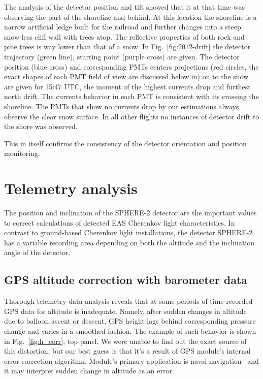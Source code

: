 \documentclass[final,5p,times,twocolumn]{elsarticle}
\begin{document}
The analysis of the detector position and tilt showed that it at that time was observing the part of the shoreline and behind. At this location the shoreline is a narrow artificial ledge built for the railroad and further changes into a steep snow-less cliff wall with trees atop. The reflective properties of both rock and pine trees is way lower than that of a snow. In Fig.~\ref{fig:2012-drift} the detector trajectory (green line), starting point (purple cross) are given. The detector position (blue cross) and corresponding PMTs centers projections (red circles, the exact shapes of each PMT field of view are discussed below in) on to the snow are given for 15:47 UTC, the moment of the highest currents drop and furthest north drift. The currents behavior in each PMT is consistent with its crossing the shoreline. The PMTs that show no currents drop by our estimations always observe the clear snow surface. In all other flights no instances of detector drift to the shore was observed.

This in itself confirms the consistency of the detector orientation and position monitoring.

\section{Telemetry analysis}

The position and inclination of the SPHERE-2 detector are the important values to correct calculations of detected EAS Cherenkov light characteristics. In contrast to ground-based Cherenkov light installations, the detector SPHERE-2 has a variable recording area depending on both the altitude and the inclination angle of the detector.

\subsection{GPS altitude correction with barometer data}
\label{sect:gps_correction}

Thorough telemetry data analysis reveals that at some periods of time recorded GPS data for altitude is inadequate. Namely, after sudden changes in altitude due to balloon ascent or descent, GPS height lags behind corresponding pressure change and varies in a smoothed fashion. The example of such behavior is shown in Fig.~\ref{fig:h_corr}, top panel. We were unable to find out the exact source of this distortion, but our best guess is that it's a result of GPS module's internal error correction algorithm. Module's primary application is naval navigation~\cite{GPS-module-specs} and it may interpret sudden change in altitude as an error.
\end{document}
